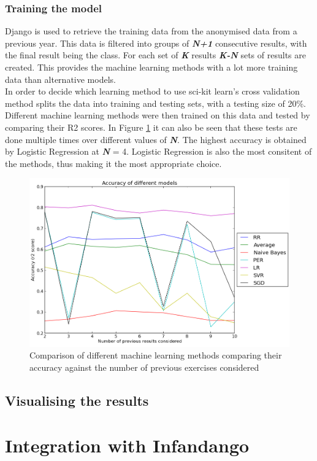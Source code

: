 \subsubsection{Training the model}
Django is used to retrieve the training data from the anonymised data from a previous year. This data is filtered into groups of \textit{\textbf{N+1}} consecutive results, with the final result being the class. For each set of \textit{\textbf{K}} results \textit{\textbf{K-N}} sets of results are created. This provides the machine learning methods with a lot more training data than alternative models.
\\%
In order to decide which learning method to use sci-kit learn's cross validation method splits the data into training and testing sets, with a testing size of 20\%. Different machine learning methods were then trained on this data and tested by comparing their R2 scores. In Figure \ref{fig:comparison} it can also be seen that these tests are done multiple times over different values of \textit{\textbf{N}}. The highest accuracy is obtained by Logistic Regression at \textit{\textbf{N}} = 4. Logistic Regression is also the most consitent of the methods, thus making it the most appropriate choice.

\begin{figure}[p]
\centering
\includegraphics[width=1\textwidth]{comparison.png}
\caption{Comparison of different machine learning methods comparing their accuracy against the number of previous exercises considered}
\label{fig:comparison}
\end{figure}


\subsection{Visualising the results}

\section{Integration with Infandango}

